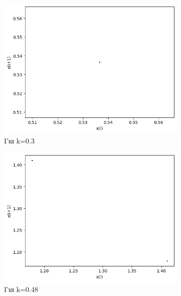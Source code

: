 \begin{figure}[h!]
	\centering
	\begin{subfigure}[b]{0.4\textwidth}
		\centering
		\includegraphics[width=\textwidth]{LateX images/graphs q05/g3}
		\caption{Για k=0.3}
		\label{f:k27}
	\end{subfigure}
	\hfill
	\begin{subfigure}[b]{0.4\textwidth}
		\centering
		\includegraphics[width=\textwidth]{LateX images/graphs q05/g4}
		\caption{Για k=0.48}
		\label{f:k28}
	\end{subfigure}
	\hfill
	\begin{subfigure}[b]{0.4\textwidth}
		\centering

\end{subfigure}
\end{figure}
